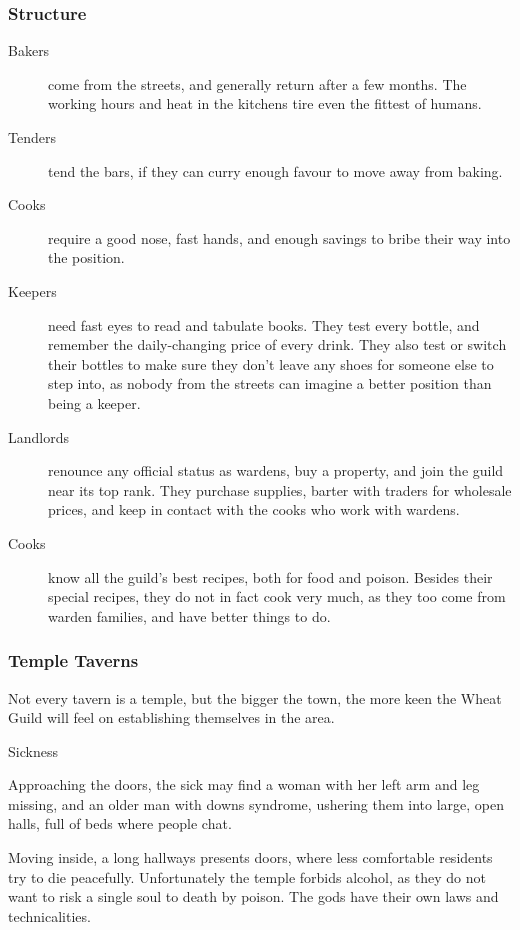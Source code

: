 \begin{multicols}{2}
\subsubsection{Structure}

\begin{description}
  \item[Bakers]
  come from the streets, and generally return after a few months.
  The working hours and heat in the kitchens tire even the fittest of humans.
  \item[Tenders]
  tend the bars, if they can curry enough favour to move away from baking.
  \item[Cooks]
  require a good nose, fast hands, and enough savings to bribe their way into the position.
  \item[Keepers]
  need fast eyes to read and tabulate books.
  They test every bottle, and remember the daily-changing price of every drink.
  They also test or switch their bottles to make sure they don't leave any shoes for someone else to step into, as nobody from the streets can imagine a better position than being a keeper.
  \item[Landlords]
  renounce any official status as wardens, buy a property, and join the guild near its top rank.
  They purchase supplies, barter with traders for wholesale prices, and keep in contact with the cooks who work with wardens.
  \item[Cooks]
  know all the guild's best recipes, both for food and poison.
  Besides their special recipes, they do not in fact cook very much, as they too come from warden families, and have better things to do.
\end{description}

\subsubsection{Temple Taverns}

Not every tavern is a temple, but the bigger the town, the more keen the Wheat Guild will feel on establishing themselves in the area.

  {\decotwo}%
  {Sickness}%
  {
    Approaching the doors, the sick may find a woman with her left arm and leg missing, and an older man with downs syndrome, ushering them into large, open halls, full of beds where people chat.

    Moving inside, a long hallways presents doors, where less comfortable residents try to die peacefully.
    Unfortunately the temple forbids alcohol, as they do not want to risk a single soul to death by poison.
    The gods have their own laws and technicalities.

}
\end{multicols}
